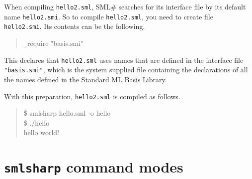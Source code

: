\documentclass{jbook}
\newcommand{\txt}[2]{#2}
\newcommand{\smlsharp}{SML\#}
\newenvironment{program}{\begin{quote}\begin{tt}}%
                        {\end{tt}\end{quote}}
\begin{document}
	When compiling {\tt hello2.sml}, \smlsharp{} searches for 
its interface file by its default name {\tt hello2.smi}.
	So to compile {\tt hello2.sml}, you need to create file {\tt
hello2.smi}.
	Its contents can be the following.
\begin{program}
\verb|_|require "basis.smi"
\end{program}
	This declares that {\tt hello2.sml} uses names that are defined
in the interface file {\tt "basis.smi"}, which is the system supplied
file containing the declarations of all the names defined in the
Standard ML Basis Library.

	With this preparation, {\tt hello2.sml} is compiled as follows.
\begin{program}
\$ smlsharp hello.sml -o hello\\
\$ ./hello\\
hello world!
\end{program}
\fi%

\section{
\txt{{\tt smlsharp}コマンドの起動モード}
    {{\tt smlsharp} command modes}
}
\label{sec:tutorialSmlsharpParameter}
\end{document}
